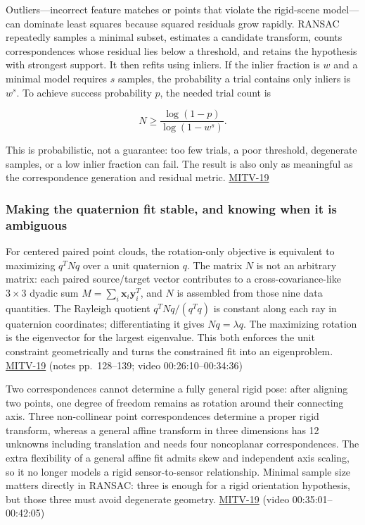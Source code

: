 Outliers---incorrect feature matches or points that violate the rigid-scene model---can dominate least squares because squared residuals grow rapidly. RANSAC repeatedly samples a minimal subset, estimates a candidate transform, counts correspondences whose residual lies below a threshold, and retains the hypothesis with strongest support. It then refits using inliers. If the inlier fraction is \(w\) and a minimal model requires \(s\) samples, the probability a trial contains only inliers is \(w^s\). To achieve success probability \(p\), the needed trial count is

\[
N\ge\frac{\log(1-p)}{\log(1-w^s)}.
\]

This is probabilistic, not a guarantee: too few trials, a poor threshold, degenerate samples, or a low inlier fraction can fail. The result is also only as meaningful as the correspondence generation and residual metric. \hyperref[04-visual-computing-ii-ch036]{MITV-19}

\subsubsection{Making the quaternion fit stable, and knowing when it is ambiguous}\label{making-the-quaternion-fit-stable-and-knowing-when-it-is-ambiguous}

For centered paired point clouds, the rotation-only objective is equivalent to maximizing \(q^TNq\) over a unit quaternion \(q\). The matrix \(N\) is not an arbitrary matrix: each paired source/target vector contributes to a cross-covariance-like \(3\times3\) dyadic sum \(M=\sum_i \mathbf{x}_i\mathbf{y}_i^T\), and \(N\) is assembled from those nine data quantities. The Rayleigh quotient \(q^TNq/(q^Tq)\) is constant along each ray in quaternion coordinates; differentiating it gives \(Nq=\lambda q\). The maximizing rotation is the eigenvector for the largest eigenvalue. This both enforces the unit constraint geometrically and turns the constrained fit into an eigenproblem. \hyperref[04-visual-computing-ii-ch036]{MITV-19} (notes pp.~128--139; video 00:26:10--00:34:36)

Two correspondences cannot determine a fully general rigid pose: after aligning two points, one degree of freedom remains as rotation around their connecting axis. Three non-collinear point correspondences determine a proper rigid transform, whereas a general affine transform in three dimensions has 12 unknowns including translation and needs four noncoplanar correspondences. The extra flexibility of a general affine fit admits skew and independent axis scaling, so it no longer models a rigid sensor-to-sensor relationship. Minimal sample size matters directly in RANSAC: three is enough for a rigid orientation hypothesis, but those three must avoid degenerate geometry. \hyperref[04-visual-computing-ii-ch036]{MITV-19} (video 00:35:01--00:42:05)

